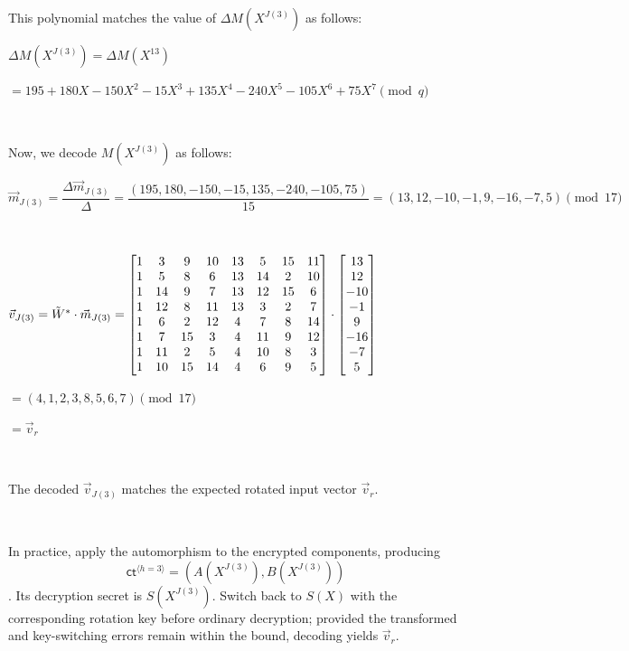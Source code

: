 This polynomial matches the value of $\Delta M(X^{J(3)})$ as follows:

$\Delta M(X^{J(3)}) = \Delta M(X^{13}) $

$= 195 + 180X - 150X^2 - 15X^3 + 135X^4 - 240X^5 - 105X^6 + 75X^7 \pmod{q}$

$ $




Now, we decode $M(X^{J(3)})$ as follows: 

$\vec{m}_{J(3)} = \dfrac{\Delta \vec{m}_{J(3)}}{\Delta} = \dfrac{(195, 180, -150, -15, 135, -240, -105, 75)}{15} = (13, 12, -10, -1, 9, -16, -7, 5) \pmod{17}$

$ $


$\vec{v}_{J(3)} = \tilde{W}^* \cdot \vec{m}_{J(3)} = \begin{bmatrix}
1&3&9&10&13&5&15&11\\
1&5&8&6&13&14&2&10\\
1&14&9&7&13&12&15&6\\
1&12&8&11&13&3&2&7\\
1&6&2&12&4&7&8&14\\
1&7&15&3&4&11&9&12\\
1&11&2&5&4&10&8&3\\
1&10&15&14&4&6&9&5\\
\end{bmatrix} \cdot \begin{bmatrix}
13\\
12\\
-10\\
-1\\
9\\
-16\\
-7\\
5\end{bmatrix}$

$= (4, 1, 2, 3, 8, 5, 6, 7) \pmod{17}$

$= \vec{v}_r$

$ $

The decoded $\vec{v}_{J(3)}$ matches the expected rotated input vector $\vec{v}_r$.  


$ $

In practice, apply the automorphism to the encrypted components, producing
\[
\textsf{ct}^{\langle h=3\rangle}=(A(X^{J(3)}),B(X^{J(3)}))
\]
. Its decryption secret is $S(X^{J(3)})$. Switch back to $S(X)$ with the corresponding rotation key before ordinary decryption; provided the transformed and key-switching errors remain within the bound, decoding yields $\vec v_r$.


